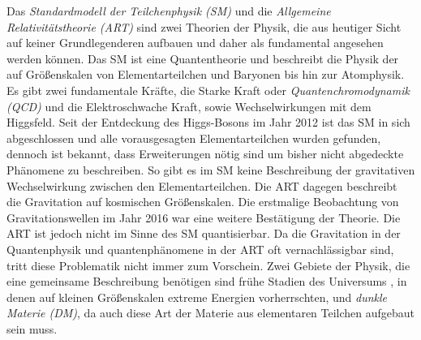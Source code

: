 %   

Das \textit{Standardmodell der Teilchenphysik (SM)} und die 
\textit{Allgemeine Relativitätstheorie (ART)} sind zwei Theorien der 
Physik, die aus heutiger Sicht auf keiner Grundlegenderen aufbauen und 
daher als fundamental angesehen werden können. Das SM ist eine Quantentheorie 
und beschreibt die Physik der auf Größenskalen von Elementarteilchen und 
Baryonen bis hin zur Atomphysik. Es gibt zwei fundamentale Kräfte, 
die Starke Kraft oder \textit{Quantenchromodynamik (QCD)} und die 
Elektroschwache Kraft, sowie Wechselwirkungen mit dem Higgsfeld. Seit 
der Entdeckung des Higgs-Bosons im Jahr 2012 \cite{Higgs} ist das SM in sich 
abgeschlossen und alle vorausgesagten Elementarteilchen wurden gefunden, 
dennoch ist bekannt, dass Erweiterungen nötig sind um bisher nicht abgedeckte 
Phänomene zu beschreiben. So gibt es im SM keine Beschreibung der gravitativen 
Wechselwirkung zwischen den Elementarteilchen. Die ART dagegen beschreibt die 
Gravitation auf kosmischen Größenskalen. Die erstmalige Beobachtung von 
Gravitationswellen im Jahr 2016 \cite{gravitational_waves} war eine weitere 
Bestätigung der Theorie. Die ART ist jedoch nicht im Sinne des SM 
quantisierbar. Da die Gravitation in der Quantenphysik und quantenphänomene 
in der ART oft vernachlässigbar sind, tritt diese Problematik nicht immer zum 
Vorschein. Zwei Gebiete der Physik, die eine gemeinsame 
Beschreibung benötigen sind frühe Stadien des Universums 
\cite{GR_Introductory}, in denen auf kleinen 
Größenskalen extreme Energien vorherrschten, und \textit{dunkle Materie (DM)}, 
da auch diese Art der Materie aus elementaren Teilchen aufgebaut sein muss. 

